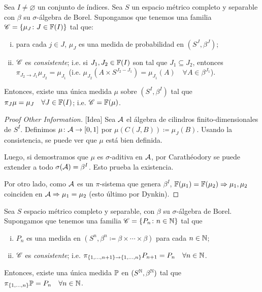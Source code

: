 \begin{theorem}
	Sea $I \neq \varnothing$ un conjunto de índices. Sea $S$ un espacio métrico completo y separable con $\beta$ su $\sigma$-álgebra de Borel. Supongamos que tenemos una familia $\mathscr{C} = \{\mu_{J} \colon J \in \mathbb{F}(I)\}$ tal que:
	\begin{enumerate}[i)]
		\item para cada $j \in J$, $\mu_{J}$ es una medida de probabilidad en $(S^{J}, \beta^{J})$;

		\item $\mathscr{C}$ es \textit{consistente}; i.e. si $J_{1}, J_{2} \in \mathbb{F}(I)$ son tal que $J_{1} \subseteq J_{2}$, entonces $\pi_{J_{2} \to J_{1}} \mu_{J_{2}} = \mu_{J_{1}}$ (i.e. $\mu_{J_{2}}(A \times S^{J_{2} - J_{1}}) = \mu_{J_{1}}(A) \quad \forall A \in \beta^{J_{1}}$).
	\end{enumerate}
	Entonces, existe una única medida $\mu$ sobre $(S^{I}, \beta^{I})$ tal que $\pi_{J} \mu = \mu_{J} \quad \forall J \in \mathbb{F}(I)$; i.e. $\mathscr{C} = \mathbb{F}(\mu)$.
\end{theorem}
\begin{proof}[Proof Other Information][Idea]
	Sea $\mathcal{A}$ el álgebra de cilindros finito-dimensionales de $S^{I}$. Definimos $\mu \colon \mathcal{A} \to [0,1]$ por $\mu(C(J, B)) \coloneq \mu_{J}(B)$. Usando la consistencia, se puede ver que $\mu$ está bien definida. \par
	Luego, si demostramos que $\mu$ es $\sigma$-aditiva en $\mathcal{A}$, por Carathéodory se puede extender a todo $\sigma(\mathcal{A}) = \beta^{I}$. Esto prueba la existencia. \par
	Por otro lado, como $\mathcal{A}$ es un $\pi$-sistema que genera $\beta^{I}$, $\mathbb{F}(\mu_{1}) = \mathbb{F}(\mu_{2}) \Rightarrow \mu_{1},\mu_{2}$ coinciden en $\mathcal{A} \Rightarrow \mu_{1} = \mu_{2}$ (esto último por Dynkin).
\end{proof}

\begin{corollary}
	Sea $S$ espacio métrico completo y separable, con $\beta$ su $\sigma$-álgebra de Borel. Supongamos que tenemos una familia $\mathscr{C} = \{P_{n} \colon n \in \mathbb{N}\}$ tal que
	\begin{enumerate}[i)]
		\item $P_{n}$ es una medida en $(S^{n}, \beta^{n} \coloneq \beta \times \cdots \times \beta)$ para cada $n \in \mathbb{N}$;

		\item $\mathscr{C}$ es \textit{consistente}; i.e. $\pi_{\{1,\dots,n+1\} \to \{1,\dots,n\}} P_{n + 1} = P_{n} \quad \forall n \in \mathbb{N}$.
	\end{enumerate}
	Entonces, existe una única medida $\mathbb{P}$ en $(S^{\mathbb{N}}, \beta^{\mathbb{N}})$ tal que $\pi_{\{1,\dots,n\}} \mathbb{P} = P_{n} \quad \forall n \in \mathbb{N}$.
\end{corollary}

